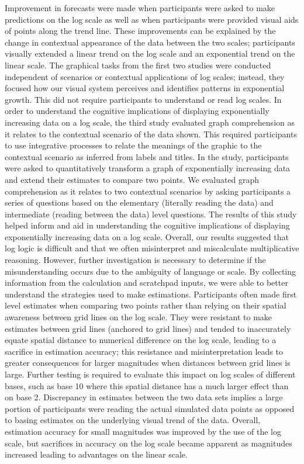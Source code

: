 \documentclass[print]{nuthesis}
\begin{document}
Improvement in forecasts were made when participants were asked to make predictions on the log scale as well as when participants were provided visual aids of points along the trend line.
These improvements can be explained by the change in contextual appearance of the data between the two scales; participants visually extended a linear trend on the log scale and an exponential trend on the linear scale.
The graphical tasks from the first two studies were conducted independent of scenarios or contextual applications of log scales; instead, they focused how our visual system perceives and identifies patterns in exponential growth.
This did not require participants to understand or read log scales.
In order to understand the cognitive implications of displaying exponentially increasing data on a log scale, the third study evaluated graph comprehension as it relates to the contextual scenario of the data shown.
This required participants to use integrative processes to relate the meanings of the graphic to the contextual scenario as inferred from labels and titles.
In the study, participants were asked to quantitatively transform a graph of exponentially increasing data and extend their estimates to compare two points.
We evaluated graph comprehension as it relates to two contextual scenarios by asking participants a series of questions based on the elementary (literally reading the data) and intermediate (reading between the data) level questions.
The results of this study helped inform and aid in understanding the cognitive implications of displaying exponentially increasing data on a log scale.
Overall, our results suggested that log logic is difficult and that we often misinterpret and miscalculate multiplicative reasoning.
However, further investigation is necessary to determine if the misunderstanding occurs due to the ambiguity of language or scale.
By collecting information from the calculation and scratchpad inputs, we were able to better understand the strategies used to make estimations.
Participants often made first level estimates when comparing two points rather than relying on their spatial awareness between grid lines on the log scale.
They were resistant to make estimates between grid lines (anchored to grid lines) and tended to inaccurately equate spatial distance to numerical difference on the log scale, leading to a sacrifice in estimation accuracy; this resistance and misinterpretation leads to greater consequences for larger magnitudes when distances between grid lines is large.
Further testing is required to evaluate this impact on log scales of different bases, such as base 10 where this spatial distance has a much larger effect than on base 2.
Discrepancy in estimates between the two data sets implies a large portion of participants were reading the actual simulated data points as opposed to basing estimates on the underlying visual trend of the data.
Overall, estimation accuracy for small magnitudes was improved by the use of the log scale, but sacrifices in accuracy on the log scale became apparent as magnitudes increased leading to advantages on the linear scale.
\end{document}
